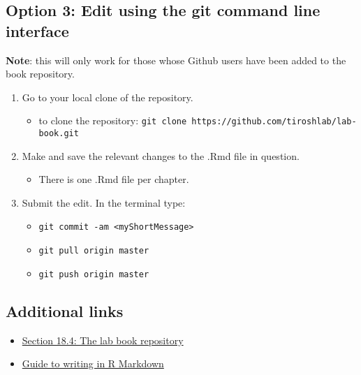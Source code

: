 \documentclass[
]{book}
\providecommand{\tightlist}{%
  \setlength{\itemsep}{0pt}\setlength{\parskip}{0pt}}
\begin{document}
\hypertarget{option-3-edit-using-the-git-command-line-interface}{%
\subsection{Option 3: Edit using the git command line interface}\label{option-3-edit-using-the-git-command-line-interface}}

\textbf{Note}: this will only work for those whose Github users have been added to the book repository.

\begin{enumerate}
\def\labelenumi{\arabic{enumi}.}
\tightlist
\item
  Go to your local clone of the repository.

  \begin{itemize}
  \tightlist
  \item
    to clone the repository: \texttt{git\ clone\ https://github.com/tiroshlab/lab-book.git}\\
  \end{itemize}
\item
  Make and save the relevant changes to the .Rmd file in question.

  \begin{itemize}
  \tightlist
  \item
    There is one .Rmd file per chapter.
  \end{itemize}
\item
  Submit the edit. In the terminal type:

  \begin{itemize}
  \tightlist
  \item
    \texttt{git\ commit\ -am\ \textless{}myShortMessage\textgreater{}}
  \item
    \texttt{git\ pull\ origin\ master}
  \item
    \texttt{git\ push\ origin\ master}
  \end{itemize}
\end{enumerate}

\hypertarget{additional-links}{%
\subsection{Additional links}\label{additional-links}}

\begin{itemize}
\tightlist
\item
  \href{https://tiroshlab.github.io/lab-book/labGitHub.html\#the-lab-book-repository}{Section 18.4: The lab book repository}
\item
  \href{https://bookdown.org/yihui/rmarkdown-cookbook/}{Guide to writing in R Markdown}
\end{itemize}
\end{document}
